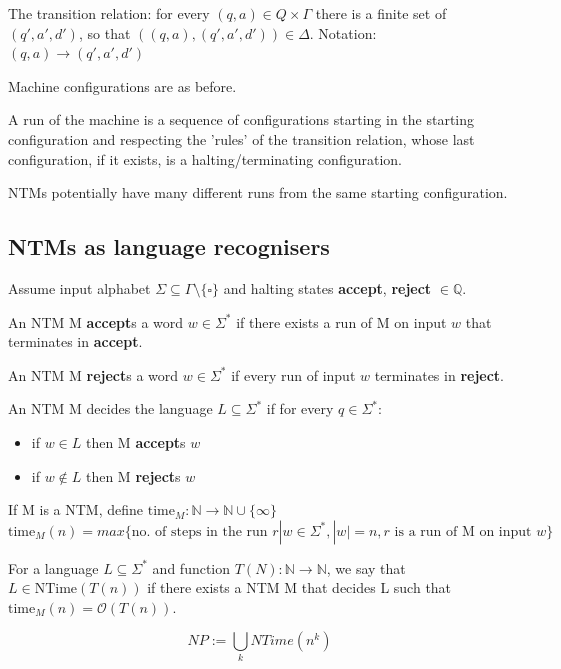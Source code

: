 \documentclass[a4paper,12pt]{article}
\theoremstyle{definition}
\theoremstyle{remark}
\newcommand{\N}{\mathbb{N}}
\newcommand{\Q}{\mathbb{Q}}
\begin{document}
The transition relation: for every $(q, a) \in Q \times \Gamma$ there is a finite set of $(q', a', d')$, so that
$((q, a), (q', a', d')) \in \Delta$. Notation: $(q, a) \to (q', a', d')$

Machine configurations are as before.

A run of the machine is a sequence of configurations starting in the starting configuration and respecting the 'rules' of the 
transition relation, whose last configuration, if it exists, is a halting/terminating configuration.

NTMs potentially have many different runs from the same starting configuration.


\subsection{NTMs as language recognisers}

Assume input alphabet $\Sigma \subseteq \Gamma \setminus \{\square\}$ and halting states \textbf{accept}, \textbf{reject} $\in \Q$.

An NTM M \textbf{accept}s a word $w \in \Sigma^*$ if there exists a run of M on input $w$ that terminates in \textbf{accept}.

An NTM M \textbf{reject}s a word $w \in \Sigma^*$ if every run of input $w$ terminates in \textbf{reject}.

An NTM M decides the language $L \subseteq \Sigma^*$ if for every $q \in \Sigma^*$:
\begin{itemize}
    \item if $w \in L$ then M \textbf{accept}s $w$
    \item if $w \notin L$ then M \textbf{reject}s $w$
\end{itemize}


If M is a NTM, define $\text{time}_M: \N \to \N \cup \{\infty\}$
\begin{dmath*}
    \text{time}_M(n) = max \{\text{no. of steps in the run } r | w \in \Sigma^*, |w| = n, r \text{ is a run of M on input } w\}
\end{dmath*}

For a language $L \subseteq \Sigma^*$ and function $T(N): \N \to \N$, we say that $L \in \text{NTime}(T(n))$ if there exists a NTM M
that decides L such that $\text{time}_M(n) = \mathscr{O}(T(n))$.

\begin{equation*}
    NP := \bigcup\limits_{k} NTime(n^k)
\end{equation*}
\end{document}
